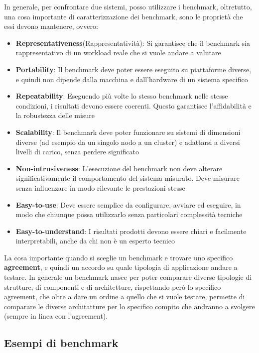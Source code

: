 In generale, per confrontare due sistemi, posso utilizzare i benchmark, oltretutto, una cosa importante di caratterizzazione dei benchmark, sono le proprietà che essi devono mantenere, ovvero:
\begin{itemize}
    \item \textbf{Representativeness}(Rappresentatività): Si garantisce che il benchmark sia rappresentativo di un workload reale che si vuole andare a valutare 
    \item \textbf{Portability}: Il benchmark deve poter essere eseguito su piattaforme diverse, e quindi non dipende dalla macchina e dall'hardware di un sistema specifico
    \item \textbf{Repeatability}: Eseguendo più volte lo stesso benchmark nelle stesse condizioni, i risultati devono essere coerenti. Questo garantisce l’affidabilità e la robustezza delle misure
    \item \textbf{Scalability}: Il benchmark deve poter funzionare su sistemi di dimensioni diverse (ad esempio da un singolo nodo a un cluster) e adattarsi a diversi livelli di carico, senza perdere significato
    \item \textbf{Non-intrusiveness}: L’esecuzione del benchmark non deve alterare significativamente il comportamento del sistema misurato. Deve misurare senza influenzare in modo rilevante le prestazioni stesse
    \item \textbf{Easy-to-use}: Deve essere semplice da configurare, avviare ed eseguire, in modo che chiunque possa utilizzarlo senza particolari complessità tecniche
    \item \textbf{Easy-to-understand}: I risultati prodotti devono essere chiari e facilmente interpretabili, anche da chi non è un esperto tecnico
\end{itemize}

La cosa importante quando si sceglie un benchmark e trovare uno specifico \textbf{agreement}, e quindi un accordo su quale tipologia di applicazione andare a testare. In generale un benchmark nasce per poter comparare diverse tipologie di strutture, di componenti e di architetture, rispettando però lo specifico agreement, che oltre a dare un ordine a quello che si vuole testare, permette di comparare le diverse architatture per lo specifico compito che andranno a svolgere (sempre in linea con l'agreement).

\subsection{Esempi di benchmark}
